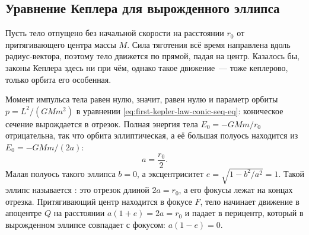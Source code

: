\subsection{Уравнение Кеплера для вырожденного эллипса}
\label{sec:kepler-eq-degenerate}
Пусть тело отпущено без начальной скорости на расстоянии $r_0$ от притягивающего центра массы $M$. Сила тяготения всё время направлена вдоль радиус-вектора, поэтому тело движется по прямой, падая на центр. Казалось бы, законы Кеплера здесь ни при чём, однако такое движение~--- тоже кеплерово, только орбита его особенная.

Момент импульса тела равен нулю, значит, равен нулю и параметр орбиты $p = L^2 / (GMm^2)$ в уравнении \eqref{eq:first-kepler-law-conic-seq-eq}: коническое сечение вырождается в отрезок. Полная энергия тела $E_0 = -GMm / r_0$ отрицательна, так что орбита эллиптическая, а её большая полуось находится из $E_0 = -GMm / (2a)$:
\begin{equation*}
    a = \frac{r_0}{2}.
\end{equation*}
Малая полуось такого эллипса $b = 0$, а эксцентриситет $e = \sqrt{1 - b^2 / a^2} = 1$. Такой эллипс называется : это отрезок длиной $2a = r_0$, а его фокусы лежат на концах отрезка. Притягивающий центр находится в фокусе $F$, тело начинает движение в апоцентре $Q$ на расстоянии $a(1 + e) = 2a = r_0$ и падает в перицентр, который в вырожденном эллипсе совпадает с фокусом: $a (1 - e) = 0$.

